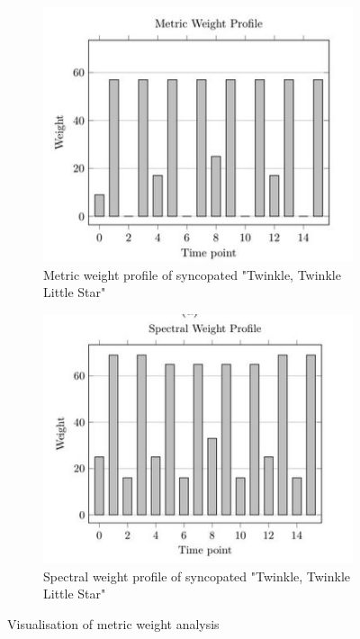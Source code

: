 \begin{figure}[H]
    \begin{subfigure}{0.45\textwidth}
        \centering
        \includegraphics[width=\linewidth]{IMAGES/IMA3.JPG}
        \caption{Metric weight profile of syncopated "Twinkle, Twinkle Little Star"}
        \label{fig:ima3}
    \end{subfigure}
    \begin{subfigure}{0.45\textwidth}
        \centering
        \includegraphics[width=\linewidth]{IMAGES/IMA4.JPG}
        \caption{Spectral weight profile of syncopated "Twinkle, Twinkle Little Star"}
        \label{fig:ima4}
    \end{subfigure}

    \caption{Visualisation of metric weight analysis \cite{Bemman2024}}
    \label{fig:ima_all}
\end{figure}

